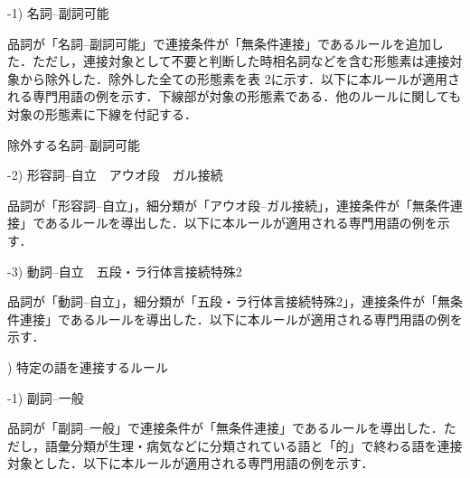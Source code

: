 \documentclass[japanese]{jnlp_1.4}
\begin{document}
-1) 名詞--副詞可能

品詞が「名詞--副詞可能」で連接条件が「無条件連接」であるルールを追加した．ただし，連接対象として不要と判断した時相名詞などを含む形態素は連接対象から除外した．除外した全ての形態素を表 2に示す．以下に本ルールが適用される専門用語の例を示す．下線部が対象の形態素である．他のルールに関しても対象の形態素に下線を付記する．

\vspace{1zw}
\vspace{1zw}

\begin{table}[t]
\caption{除外する名詞--副詞可能}

\end{table}

-2) 形容詞--自立　アウオ段　ガル接続

品詞が「形容詞--自立」，細分類が「アウオ段--ガル接続」，連接条件が「無条件連接」であるルールを導出した．以下に本ルールが適用される専門用語の例を示す．

\vspace{1zw}
\vspace{1zw}

-3) 動詞--自立　五段・ラ行体言接続特殊2

品詞が「動詞--自立」，細分類が「五段・ラ行体言接続特殊2」，連接条件が「無条件連接」であるルールを導出した．以下に本ルールが適用される専門用語の例を示す．

\vspace{1zw}
\vspace{1zw}

) 特定の語を連接するルール

-1) 副詞--一般

品詞が「副詞--一般」で連接条件が「無条件連接」であるルールを導出した．ただし，語彙分類が生理・病気などに分類されている語と「的」で終わる語を連接対象とした．以下に本ルールが適用される専門用語の例を示す．

\vspace{1zw}
\vspace{1zw}
\end{document}
